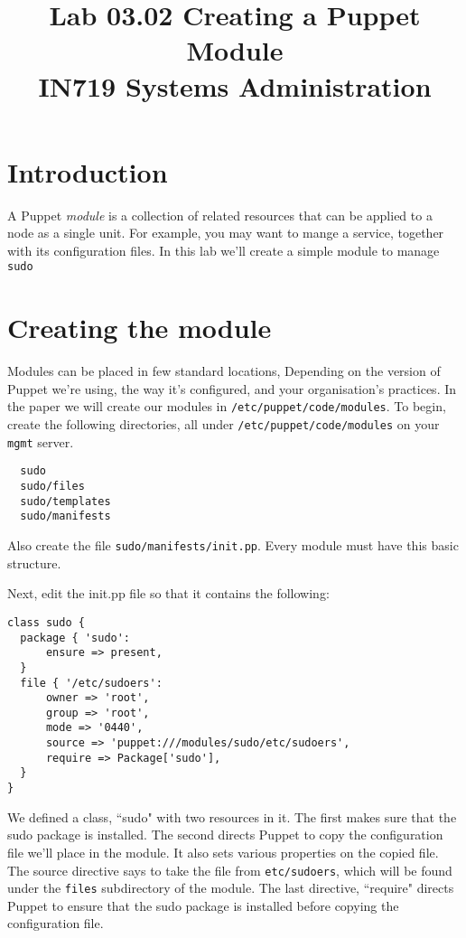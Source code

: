 \documentclass{article}   	%
\title{Lab 03.02 Creating a Puppet Module \\ IN719 Systems Administration}
\date{}							%
\begin{document}
\maketitle

\section*{Introduction}
A Puppet \emph{module} is a collection of related resources that can be applied to a node as a single unit. For example, you may want to mange a service, together with its configuration files.  In this lab we'll create a simple module to manage \texttt{sudo}

\section*{Creating the module}
Modules can be placed in few standard locations, Depending on the version of Puppet we're using, the way it's configured, and your organisation's practices.  In the paper we will create our modules in \texttt{/etc/puppet/code/modules}.  To begin, create the following directories, all under \texttt{/etc/puppet/code/modules} on your \texttt{mgmt} server.
\begin{verbatim}
  sudo
  sudo/files
  sudo/templates
  sudo/manifests
\end{verbatim}
Also create the file \texttt{sudo/manifests/init.pp}.  Every module must have this basic structure.

Next, edit the init.pp file so that it contains the following:


\begin{verbatim}
class sudo {
  package { 'sudo':
      ensure => present,
  }
  file { '/etc/sudoers':
      owner => 'root',
      group => 'root',
      mode => '0440',
      source => 'puppet:///modules/sudo/etc/sudoers',
      require => Package['sudo'],
  }
}
\end{verbatim}

We defined a class, ``sudo" with two resources in it.  The first makes sure that the sudo package is installed.  The second directs Puppet to copy the configuration file we'll place in the module.  It also sets various properties on the copied file.  The source directive says to take the file from \texttt{etc/sudoers}, which will be found under the \texttt{files} subdirectory of the module.  The last directive, ``require" directs Puppet to ensure that the sudo package is installed before copying the configuration file.
\end{document}
